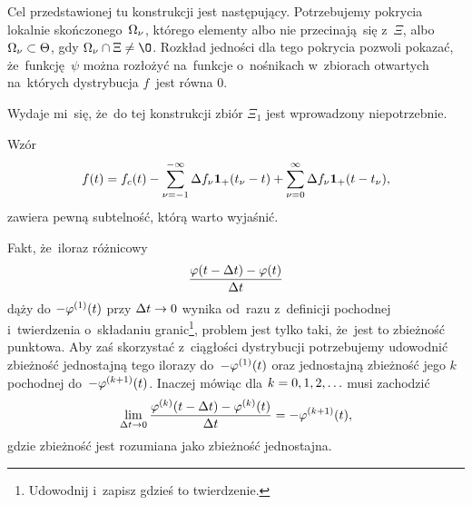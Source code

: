 \documentclass[a4paper,11pt]{article}
\begin{document}
\vspace{\spaceFour}


\start {} Cel przedstawionej tu konstrukcji jest następujący.
Potrzebujemy pokrycia lokalnie skończonego~$\Omega_{ \nu }$, którego
elementy albo nie przecinają~się z~$\Xi$, albo
$\Omega_{ \nu } \subset \Theta$, gdy $\Om_{ \nu } \cap \Xi \neq \O$.
Rozkład jedności dla tego pokrycia pozwoli pokazać, że~funkcję~$\psi$
można rozłożyć na~funkcje o~nośnikach w~zbiorach otwartych na~których
dystrybucja $f$~jest równa $0$.

Wydaje mi~się, że~do tej konstrukcji zbiór $\Xi_{ 1 }$ jest
wprowadzony niepotrzebnie.

\vspace{\spaceFour}


\start {}

\vspace{\spaceFour}


\start {}

\vspace{\spaceFour}


\start {} Wzór
\begin{equation}
  \label{eq:Zem-s01-07}
  f( t ) = f_{ c }( t ) - \sum\limits_{ \nu = -1 }^{ -\infty } \Delta f_{ \nu }
  \mathbf{1}_{ + }( t_{ \nu } - t ) + \sum\limits_{ \nu = 0 }^{ \infty } \Delta f_{ \nu }
  \mathbf{1}_{ + }( t - t_{ \nu } ),
\end{equation}
zawiera pewną subtelność, którą warto wyjaśnić. \Dok

\vspace{\spaceFour}


\start {} Fakt, że~iloraz różnicowy
\begin{equation}
  \label{eq:Zem-s01-08}
  \frac{ \varphi( t - \Delta t ) - \varphi( t ) }{ \Delta t }
\end{equation}
dąży do $-\varphi^{ ( 1 ) }( t )$ przy $\Delta t \to 0$ wynika od~razu z~definicji
pochodnej i~twierdzenia o~składaniu granic\footnote{Udowodnij i~zapisz
  gdzieś to twierdzenie.}, problem jest tylko taki, że~jest to
zbieżność punktowa. Aby zaś skorzystać z~ciągłości dystrybucji
potrzebujemy udowodnić zbieżność jednostajną tego ilorazy do~$-\varphi^{ ( 1 ) }( t )$
oraz jednostajną zbieżność jego $k$\dywiz pochodnej
do~$-\varphi^{ ( k + 1 ) }( t )$. Inaczej mówiąc dla $k = 0, 1, 2, \ldots$
musi zachodzić
\begin{equation}
  \label{eq:Zem-s01-09}
  \lim\limits_{ \Delta t \to 0 } \frac{ \varphi^{ ( k ) }( t - \Delta t ) - \varphi^{ ( k ) }( t ) }
  { \Delta t } = -\varphi^{ ( k + 1 ) }( t ),
\end{equation}
gdzie zbieżność jest rozumiana jako zbieżność jednostajna.
\end{document}
